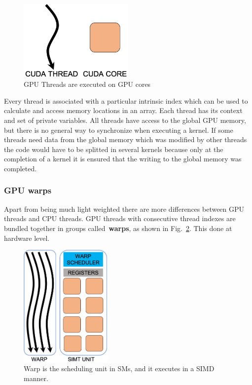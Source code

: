 \begin{figure}[!h]
\centering\includegraphics[width=0.5\textwidth]{fig_hardware/thread_core.jpg}
\caption{GPU Threads are executed on GPU cores}\label{fig:thread_core}
\end{figure}


\par
Every thread is associated with a particular intrinsic index which can be used to calculate and access memory locations in an array. 
Each thread has its context and set of private variables.
All threads have access to the global GPU memory, but there is no general way to synchronize when executing a kernel.
If some threads need data from the global memory which was modified by other threads the code would have to be splitted in several kernels because only at the completion of a kernel it is ensured that the writing to the global memory was completed.


\subsubsection{GPU warps}


\par
Apart from being much light weighted there are more differences between GPU threads and CPU threads.
GPU threads with consecutive thread indexes are bundled together in groups called~\textbf{warps}, as shown in Fig.~\ref{fig:warp_simt}.
This done at hardware level.


\begin{figure}[!h]
\centering\includegraphics[width=0.4\textwidth]{fig_hardware/warp_simt.jpg}
\caption{Warp is the scheduling unit in SMs, and it executes in a SIMD manner.}\label{fig:warp_simt}
\end{figure}


